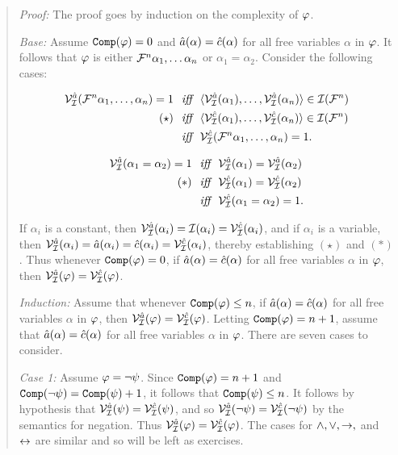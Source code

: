 \begin{quote} 
  \textit{Proof:} 
  The proof goes by induction on the complexity of $\varphi$.

  \textit{Base:} Assume $\texttt{Comp}(\varphi)=0$ and $\hat{a}(\alpha)=\hat{c}(\alpha)$ for all free variables $\alpha$ in $\varphi$.
  It follows that $\varphi$ is either $\mathcal{F}^n\alpha_1,\ldots\alpha_n$ or $\alpha_1=\alpha_2$.
  Consider the following cases:

  \vspace{-.2in}
  \begin{align*}
    \mathcal{V}_{\mathcal{I}}^{\hat{a}}(\mathcal{F}^n\alpha_1,\ldots,\alpha_n)=1 &\textit{ ~iff~ } \langle\mathcal{V}_{\mathcal{I}}^{\hat{a}}(\alpha_1),\ldots,\mathcal{V}_{\mathcal{I}}^{\hat{a}}(\alpha_n)\rangle\in\mathcal{I}(\mathcal{F}^n)\\
      (\star) &\textit{ ~iff~ } \langle\mathcal{V}_{\mathcal{I}}^{\hat{c}}(\alpha_1),\ldots,\mathcal{V}_{\mathcal{I}}^{\hat{c}}(\alpha_n)\rangle\in\mathcal{I}(\mathcal{F}^n)\\
      &\textit{ ~iff~ } \mathcal{V}_{\mathcal{I}}^{\hat{c}}(\mathcal{F}^n\alpha_1,\ldots,\alpha_n)=1.
  \end{align*}

  \vspace{-.2in}
  \begin{align*}
    \mathcal{V}_{\mathcal{I}}^{\hat{a}}(\alpha_1=\alpha_2)=1 &\textit{ ~iff~ } \mathcal{V}_{\mathcal{I}}^{\hat{a}}(\alpha_1) = \mathcal{V}_{\mathcal{I}}^{\hat{a}}(\alpha_2)\\
      (\ast) &\textit{ ~iff~ } \mathcal{V}_{\mathcal{I}}^{\hat{c}}(\alpha_1) = \mathcal{V}_{\mathcal{I}}^{\hat{c}}(\alpha_2)\\
      &\textit{ ~iff~ } \mathcal{V}_{\mathcal{I}}^{\hat{c}}(\alpha_1=\alpha_2)=1.
  \end{align*}

  If $\alpha_i$ is a constant, then $\mathcal{V}_{\mathcal{I}}^{\hat{a}}(\alpha_i)=\mathcal{I}(\alpha_i)=\mathcal{V}_{\mathcal{I}}^{\hat{c}}(\alpha_i)$, and if $\alpha_i$ is a variable, then $\mathcal{V}_{\mathcal{I}}^{\hat{a}}(\alpha_i)=\hat{a}(\alpha_i)=\hat{c}(\alpha_i)=\mathcal{V}_{\mathcal{I}}^{\hat{c}}(\alpha_i)$, thereby establishing $(\star)$ and $(\ast)$.
  Thus whenever $\texttt{Comp}(\varphi)=0$, if $\hat{a}(\alpha)=\hat{c}(\alpha)$ for all free variables $\alpha$ in $\varphi$, then $\mathcal{V}_{\mathcal{I}}^{\hat{a}}(\varphi)=\mathcal{V}_{\mathcal{I}}^{\hat{c}}(\varphi)$.

  \textit{Induction:} Assume that whenever $\texttt{Comp}(\varphi)\leq n$, if $\hat{a}(\alpha)=\hat{c}(\alpha)$ for all free variables $\alpha$ in $\varphi$, then $\mathcal{V}_{\mathcal{I}}^{\hat{a}}(\varphi)=\mathcal{V}_{\mathcal{I}}^{\hat{c}}(\varphi)$.  
  Letting $\texttt{Comp}(\varphi)=n+1$, assume that $\hat{a}(\alpha)=\hat{c}(\alpha)$ for all free variables $\alpha$ in $\varphi$.
  There are seven cases to consider.

  \textit{Case 1:} Assume $\varphi=\neg\psi$.
  Since $\texttt{Comp}(\varphi)=n+1$ and $\texttt{Comp}(\neg\psi)=\texttt{Comp}(\psi)+1$, it follows that $\texttt{Comp}(\psi)\leq n$.
  It follows by hypothesis that $\mathcal{V}_{\mathcal{I}}^{\hat{a}}(\psi)=\mathcal{V}_{\mathcal{I}}^{\hat{c}}(\psi)$, and so $\mathcal{V}_{\mathcal{I}}^{\hat{a}}(\neg\psi)=\mathcal{V}_{\mathcal{I}}^{\hat{c}}(\neg\psi)$ by the semantics for negation.
  Thus $\mathcal{V}_{\mathcal{I}}^{\hat{a}}(\varphi)=\mathcal{V}_{\mathcal{I}}^{\hat{c}}(\varphi)$. 
  The cases for $\wedge,\vee,\rightarrow,$ and $\leftrightarrow$ are similar and so will be left as exercises.


\end{quote}
